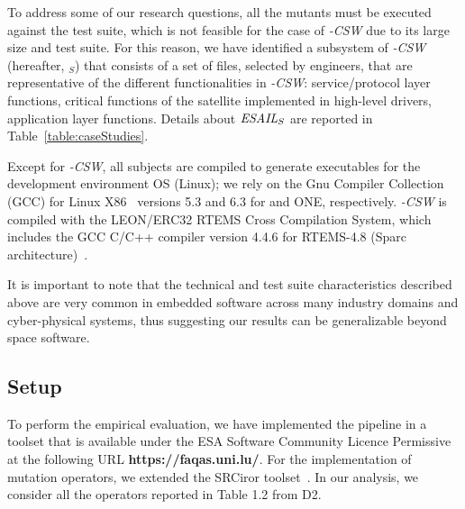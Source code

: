 To address some of our research questions, all the mutants must be executed against the test suite, which is not feasible for the case of \SAIL{}\emph{-CSW} due to its large size and test suite. For this reason, we have identified a subsystem of \SAIL{}\emph{-CSW} (hereafter, \emph{\SAIL{}}$_{S}$) that consists of a set of files, selected by \TWO engineers, that are representative of the different functionalities in \SAIL{}\emph{-CSW}: service/protocol layer functions, critical functions of the satellite implemented in high-level drivers, application layer functions.
Details about $\mathit{\emph{ESAIL}{}}_{S}$ are reported in Table~\ref{table:caseStudies}.


Except for \SAIL{}\emph{-CSW}, all subjects
are compiled to generate executables for the development environment OS (Linux); we rely on the Gnu Compiler Collection (GCC)  for Linux X86~\cite{GCC} versions 5.3 and 6.3 for \MLFS{}{} and ONE, respectively. \SAIL{}\emph{-CSW} is compiled with the
LEON/ERC32 RTEMS Cross Compilation System, which includes the GCC C/C++ compiler version 4.4.6 for  RTEMS-4.8 (Sparc architecture)~\cite{RTEMS}.

It is important to note that the technical and test suite characteristics described above are very common in embedded software across many industry domains and cyber-physical systems, thus suggesting our results can be generalizable beyond space software. 







\subsection{Setup}
\label{experimnt:setup}

To perform the empirical evaluation, we have implemented the \APPR pipeline in a toolset that is available under the ESA Software Community Licence Permissive~\cite{ESAlicence} at the following URL \textbf{https://faqas.uni.lu/}.
For the implementation of mutation operators, we extended the SRCiror toolset~\cite{hariri2018srciror}.
In our analysis, we consider all the operators reported in Table 1.2 from D2.

